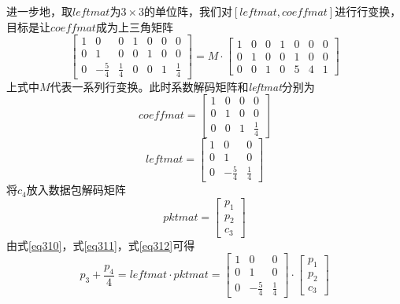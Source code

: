\par
进一步地，取$leftmat$为$3 \times 3$的单位阵，我们对$\left[leftmat,coeffmat\right]$进行行变换，目标是让$coeffmat$成为上三角矩阵
\begin{equation}\label{eq39}
\left[ {\begin{array}{*{20}{c}}
	1&0&0&1&0&0&0\\
	0&1&0&0&1&0&0\\
	0&{ - \frac{5}{4}}&{\frac{1}{4}}&0&0&1&{\frac{1}{4}}
	\end{array}} \right] = M \cdot \left[ {\begin{array}{*{20}{c}}
	1&0&0&1&0&0&0\\
	0&1&0&0&1&0&0\\
	0&0&1&0&5&4&1
	\end{array}} \right]
\end{equation}
上式中$M$代表一系列行变换。此时系数解码矩阵和\emph{leftmat}分别为
\begin{equation}\label{eq310}
coeffmat = \left[ {\begin{array}{*{20}{c}}
	1&0&0&0\\
	0&1&0&0\\
	0&0&1&{\frac{1}{4}}
	\end{array}} \right]
\end{equation}
\begin{equation}\label{eq311}
	leftmat = \left[ {\begin{array}{*{20}{c}}
		1&0&0\\
		0&1&0\\
		0&{ - \frac{5}{4}}&{\frac{1}{4}}
		\end{array}} \right]
\end{equation}
将$c_{4}$放入数据包解码矩阵
\begin{equation}\label{eq312}
	pktmat=\left[ {\begin{array}{*{20}{c}}
		{{p_1}}\\
		{{p_2}}\\
		{{c_3}}
		\end{array}} \right]
\end{equation}
由式\ref{eq310}，式\ref{eq311}，式\ref{eq312}可得
\begin{equation}\label{eq313}
{p_3} +   \frac{{{p_4}}}{4} = leftmat \cdot pktmat = \left[ {\begin{array}{*{20}{c}}
	1&0&0\\
	0&1&0\\
	0&{ - \frac{5}{4}}&{\frac{1}{4}}
	\end{array}} \right] \cdot \left[ {\begin{array}{*{20}{c}}
	{{p_1}}\\
	{{p_2}}\\
	{{c_3}}
	\end{array}} \right]
\end{equation}
